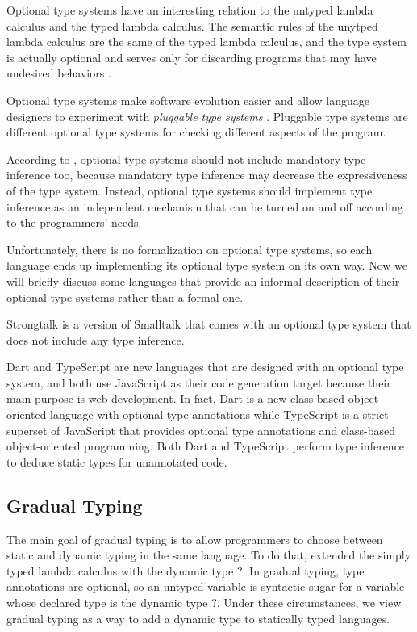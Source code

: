 \documentclass[preprint]{sig-alternate}
\begin{document}
Optional type systems have an interesting relation to the untyped
lambda calculus and the typed lambda calculus.
The semantic rules of the unytped lambda calculus are the same of the
typed lambda calculus, and the type system is actually optional and
serves only for discarding programs that may have undesired behaviors
\citep{bracha2004pluggable}.

Optional type systems make software evolution easier and
allow language designers to experiment with
\textit{pluggable type systems} \citep{bracha2004pluggable}.
Pluggable type systems are different optional type systems for
checking different aspects of the program.

According to \citet{bracha2004pluggable}, optional type systems should
not include mandatory type inference too, because mandatory type
inference may decrease the expressiveness of the type system.
Instead, optional type systems should implement type inference as
an independent mechanism that can be turned on and off according to
the programmers' needs.

Unfortunately, there is no formalization on optional type systems,
so each language ends up implementing its optional type system on
its own way.
Now we will briefly discuss some languages that provide an informal
description of their optional type systems rather than a formal one.

Strongtalk \citep{bracha1993strongtalk,bracha1996strongtalk} is
a version of Smalltalk that comes with an optional type system that
does not include any type inference.

Dart \citep{dart} and TypeScript \citep{typescript} are new
languages that are designed with an optional type system, and both
use JavaScript as their code generation target because their main
purpose is web development.
In fact, Dart is a new class-based object-oriented language with
optional type annotations while TypeScript is a strict superset of
JavaScript that provides optional type annotations and class-based
object-oriented programming.
Both Dart and TypeScript perform type inference to deduce static
types for unannotated code.

\subsection{Gradual Typing}

The main goal of gradual typing \citep{siek2006gradual} is to allow
programmers to choose between static and dynamic typing in the same
language.
To do that, \citet{siek2006gradual} extended the simply typed
lambda calculus with the dynamic type $?$.
In gradual typing, type annotations are optional, so an untyped
variable is syntactic sugar for a variable whose declared type is
the dynamic type $?$.
Under these circumstances, we view gradual typing as a way to add
a dynamic type to statically typed languages.
\end{document}
